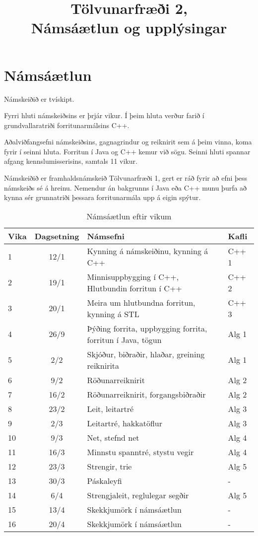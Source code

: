 \documentclass{article}
\title{Tölvunarfræði 2, \semester \\ Námsáætlun og upplýsingar}
\author{}
\begin{document}
\maketitle
{}

\section{Námsáætlun}
\label{sec:schedule}

Námskeiðið er tvískipt. 

Fyrri hluti námskeiðsins er þrjár vikur. Í þeim hluta verður farið í grundvallaratriði forritunarmálsins C++.

Aðalviðfangsefni námskeiðsins, gagnagrindur og reiknirit sem á þeim vinna, koma fyrir í seinni hluta. Forritun í Java og C++ kemur við sögu. Seinni hluti spannar afgang kennslumisserisins, samtals 11 vikur.

Námskeiðið er framhaldsnámskeið Tölvunarfræði 1, gert er ráð fyrir að efni þess námskeiðs sé á hreinu. Nemendur án bakgrunns í Java eða C++ munu þurfa að kynna sér grunnatriði þessara forritunarmála upp á eigin spýtur.

\begin{table}
\caption{Námsáætlun eftir vikum}
\label{tab:schedule}
\begin{center}
\renewcommand{\arraystretch}{1.2}
\begin{tabularx}{\linewidth}{lcXp{1cm}}
\toprule
Vika&Dagsetning&Námsefni&Kafli\\
\midrule
1	&12/1	& Kynning á námskeiðinu, kynning á C++ &C++ 1\\
2	&19/1	& Minnisuppbygging í C++, Hlutbundin forritun í C++&C++ 2\\
3	&20/1	& Meira um hlutbundna forritun, kynning á STL&C++ 3\\
4	&26/9	& Þýðing forrita, uppbygging forrita, forritun í Java, tögun&Alg 1\\
5	&2/2	& Skjóður, biðraðir, hlaðar, greining reiknirita&Alg 1\\
6	&9/2	& Röðunarreiknirit&Alg 2\\
7	&16/2	& Röðunarreiknirit, forgangsbiðraðir&Alg 2\\
8	&23/2	& Leit, leitartré&Alg 3\\
9	&2/3	& Leitartré, hakkatöflur&Alg 3\\
10	&9/3	& Net, stefnd net&Alg 4\\
11	&16/3	& Minnstu spanntré, stystu vegir&Alg 4\\
12	&23/3	& Strengir, trie&Alg 5\\
13	&30/3	& Páskaleyfi&-\\
14	&6/4	& Strengjaleit, reglulegar segðir&Alg 5\\
15	&13/4	& Skekkjumörk í námsáætlun&-\\
16	&20/4	& Skekkjumörk í námsáætlun&-\\
\bottomrule
\end{tabularx}
\end{center}
\end{table}
\end{document}
